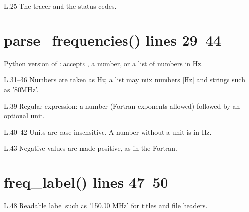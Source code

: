 \begin{lines}
\item[L.25] The tracer and the status codes.
\end{lines}
\section*{\normalsize parse\_frequencies() \hfill{\small\mdseries\color{gray}lines 29--44}}

Python version of : accepts , a number, or a list of numbers in Hz.

\begin{lines}
\item[L.31–36] Numbers are taken as Hz; a list may mix numbers [Hz] and strings such as '80MHz'.
\item[L.39] Regular expression: a number (Fortran  exponents allowed) followed by an optional unit.
\item[L.40–42] Units are case-insensitive. A number without a unit is in Hz.
\item[L.43] Negative values are made positive, as in the Fortran.
\end{lines}
\section*{\normalsize freq\_label() \hfill{\small\mdseries\color{gray}lines 47--50}}

\begin{lines}
\item[L.48] Readable label such as '150.00 MHz' for titles and file headers.
\end{lines}
